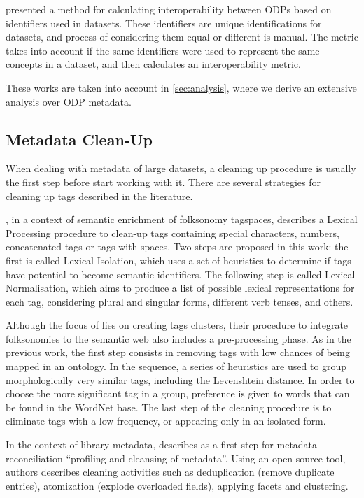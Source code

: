  presented a method for calculating interoperability between ODPs based on  identifiers used in datasets.
These identifiers are unique identifications for datasets, and process of considering them equal or different is manual.
The metric takes into account if the same identifiers were used to represent the same concepts in a dataset, and then calculates an interoperability metric.

These works are taken into account in \autoref{sec:analysis}, where we derive an extensive analysis over ODP metadata.

\subsection{Metadata Clean-Up}
\label{sec:metadata_cleanup}

When dealing with metadata of large datasets, a cleaning up procedure is usually the first step before start working with it.
There are several strategies for cleaning up tags described in the literature.

, in a context of semantic enrichment of folksonomy tagspaces, describes a Lexical Processing procedure to clean-up tags containing special characters, numbers, concatenated tags or tags with spaces.
Two steps are proposed in this work: the first is called Lexical Isolation, which uses a set of heuristics to determine if tags have potential to become semantic identifiers.
The following step is called Lexical Normalisation, which aims to produce a list of possible lexical representations for each tag, considering plural and singular forms, different verb tenses, and others.

Although the focus of  lies on creating tags clusters, their procedure to integrate folksonomies to the semantic web also includes a pre-processing phase.
As in the previous work, the first step consists in removing tags with low chances of being mapped in an ontology.
In the sequence, a series of heuristics are used to group morphologically very similar tags, including the Levenshtein distance.
In order to choose the more significant tag in a group, preference is given to words that can be found in the WordNet base.
The last step of the cleaning procedure is to eliminate tags with a low frequency, or appearing only in an isolated form.

In the context of library metadata,  describes as a first step for metadata reconciliation ``profiling and cleansing of metadata''.
Using an open source tool, authors describes cleaning activities such as deduplication (remove duplicate entries), atomization (explode overloaded fields), applying facets and clustering.


